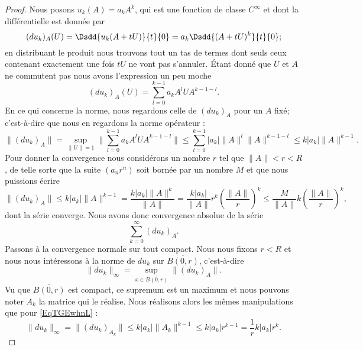 \begin{proof}
	Nous posons \( u_k(A)=a_kA^k\), qui est une fonction de classe \(  C^{\infty}\) et dont la différentielle est donnée par
	\begin{equation}
		(du_k)_A(U)=\Dsdd{ u_k(A+tU) }{t}{0}=a_k\Dsdd{ (A+tU)^k }{t}{0};
	\end{equation}
	en distribuant le produit nous trouvons tout un tas de termes dont seuls ceux contenant exactement une fois \( tU\) ne vont pas s'annuler. Étant donné que \( U\) et \( A\) ne commutent pas nous avons l'expression un peu moche
	\begin{equation}
		(du_k)_A(U)=\sum_{l=0}^{k-1}a_kA^lUA^{k-1-l}.
	\end{equation}
	En ce qui concerne la norme, nous regardons celle de \( (du_k)_A\) pour un \( A\) fixé; c'est-à-dire que nous en regardons la norme opérateur :
	\begin{equation}
		\| (du_k)_A \|=\sup_{\| U \|=1}\| \sum_{l=0}^{k-1}a_kA^lUA^{k-1-l} \|\leq \sum_{l=0}^{k-1}| a_k |\| A \|^{l}\| A \|^{k-1-l}\leq k| a_k |\| A \|^{k-1}.
	\end{equation}
	Pour donner la convergence nous considérons un nombre \( r\) tel que \( \| A \|<r<R\), de telle sorte que la suite \( (a_nr^n)\) soit bornée par un nombre \( M\) et que nous puissions écrire
	\begin{equation}    \label{EqTGEwhnL}
		\| (du_k)_A \|\leq k| a_k |\| A \|^{k-1}=\frac{ k| a_k |\| A \|^k }{ \| A \| }=\frac{ k| a_k | }{ \| A \| }r^k\left( \frac{ \| A \| }{ r } \right)^k\leq \frac{ M }{ \| A \| }k\left( \frac{ \| A \| }{ r } \right)^k,
	\end{equation}
	dont la série converge. Nous avons donc convergence absolue de la série
	\begin{equation}
		\sum_{k=0}^{\infty}(du_k)_A.
	\end{equation}
	Passons à la convergence normale sur tout compact. Nous nous fixons \( r<R\) et nous nous intéressons à la norme de \( du_k\) sur \( \overline{ B(0,r) }\), c'est-à-dire
	\begin{equation}
		\| du_k \|_{\infty}=\sup_{x\in\overline{ B(0,r) }}\| (du_k)_A \|.
	\end{equation}
	Vu que \( \overline{ B(0,r) }\) est compact, ce supremum est un maximum et nous pouvons noter \( A_k\) la matrice qui le réalise. Nous réalisons alors les mêmes manipulations que pour \eqref{EqTGEwhnL} :
	\begin{equation}
		\| du_k \|_{\infty}=\| (du_k)_{A_k} \|\leq k| a_k |\| A_k \|^{k-1}\leq  k| a_k |r^{k-1}=\frac{1}{ r }k| a_k |r^k.

\end{equation}
\end{proof}
